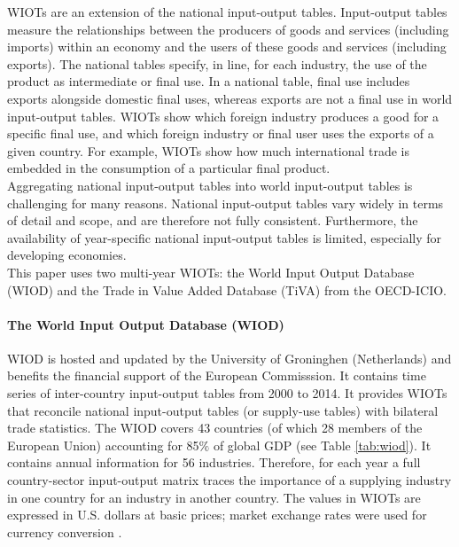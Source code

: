 \documentclass[11pt,a4paper]{article}
\begin{document}
WIOTs are an extension of the national input-output tables. 
Input-output tables measure the relationships between the producers of goods and services (including imports) within an economy and the users of these goods and services (including exports). The national tables specify, in line, for each industry, the use of the product as intermediate or final use. 
In a national table, final use includes exports alongside domestic final uses, whereas exports are not a final use in world input-output tables. 
WIOTs show which foreign industry produces a good for a specific final use, and which foreign industry or final user uses the exports of a given country. 
For example, WIOTs show how much international trade is embedded in the consumption of a particular final product. \\
Aggregating national input-output tables into world input-output tables is challenging for many reasons. National input-output tables vary widely in terms of detail and scope, and are therefore not fully consistent. Furthermore, the availability of year-specific national input-output tables is limited, especially for developing economies.  \\
This paper uses two multi-year WIOTs: the World Input Output Database (WIOD) and the Trade in Value Added Database (TiVA) from the OECD-ICIO.

\paragraph{The World Input Output Database (WIOD)}
WIOD is hosted and updated by the University of Groninghen (Netherlands) and benefits the financial support of the European Commisssion. It contains time series of inter-country input-output tables from 2000 to 2014. 
It provides WIOTs that reconcile national input-output tables (or supply-use tables) with bilateral trade statistics.
The WIOD covers 43 countries (of which 28 members of the European Union) accounting for 85$\%$ of global GDP (see Table \ref{tab:wiod}). 
It contains annual information for 56 industries. Therefore, for each year a full country-sector input-output matrix traces the importance of a supplying industry in one country for an industry in another country. The values in WIOTs are expressed in U.S. dollars at basic prices; market exchange rates were used for currency conversion \citep{Timmer2015}. 

 
\end{document}
